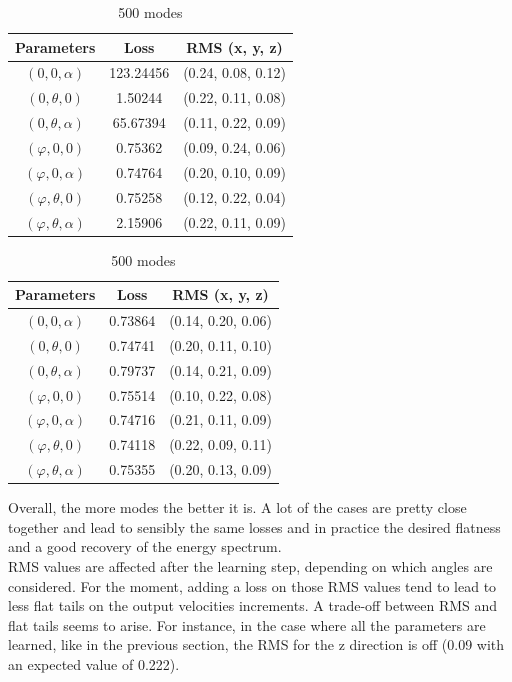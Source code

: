 \documentclass[a4paper,12pt]{article}
\theoremstyle{definition}
\begin{document}
\begin{table}[!htb]
    \caption{Losses obtain for different parameter combination}
    \begin{subtable}{.5\linewidth}
      \centering
        \caption{250 modes}
        \begin{tabular}{ c | c | c }
        Parameters & Loss & RMS (x, y, z)\\
        \hline
        $(0,0,\alpha)$ & 123.24456 & (0.24, 0.08, 0.12)\\
        $(0, \theta, 0)$ & 1.50244 & (0.22, 0.11, 0.08)\\
        $(0, \theta,\alpha)$ & 65.67394 & (0.11, 0.22, 0.09)\\
        $(\varphi, 0, 0)$ & 0.75362 & (0.09, 0.24, 0.06)\\
        $(\varphi, 0, \alpha)$ & 0.74764 & (0.20, 0.10, 0.09)\\
        $(\varphi,\theta, 0)$ & 0.75258 & (0.12, 0.22, 0.04)\\
        $(\varphi,\theta,\alpha)$ & 2.15906 & (0.22, 0.11, 0.09)\\
    \end{tabular}
    \end{subtable}%
    \begin{subtable}{.5\linewidth}
      \centering
        \caption{500 modes}
        \begin{tabular}{ c | c | c }
        Parameters & Loss & RMS (x, y, z)\\
        \hline
        $(0,0,\alpha)$ & 0.73864 & (0.14, 0.20, 0.06)\\
        $(0, \theta, 0)$ & 0.74741 & (0.20, 0.11, 0.10)\\
        $(0, \theta,\alpha)$ & 0.79737 & (0.14, 0.21, 0.09)\\
        $(\varphi, 0, 0)$ & 0.75514 & (0.10, 0.22, 0.08)\\
        $(\varphi, 0, \alpha)$ & 0.74716 & (0.21, 0.11, 0.09)\\
        $(\varphi,\theta, 0)$ & 0.74118 & (0.22, 0.09, 0.11)\\
        $(\varphi,\theta,\alpha)$ & 0.75355 & (0.20, 0.13, 0.09)\\
        \end{tabular}
    \end{subtable} 
\end{table}


Overall, the more modes the better it is. A lot of the cases are pretty close together and lead to sensibly the same losses and in practice the desired flatness and a good recovery of the energy spectrum. \\
RMS values are affected after the learning step, depending on which angles are considered. For the moment, adding a loss on those RMS values tend to lead to less flat tails on the output velocities increments. A trade-off between RMS and flat tails seems to arise. For instance, in the case where all the parameters are learned, like in the previous section, the RMS for the z direction is off (0.09 with an expected value of 0.222).
\end{document}
